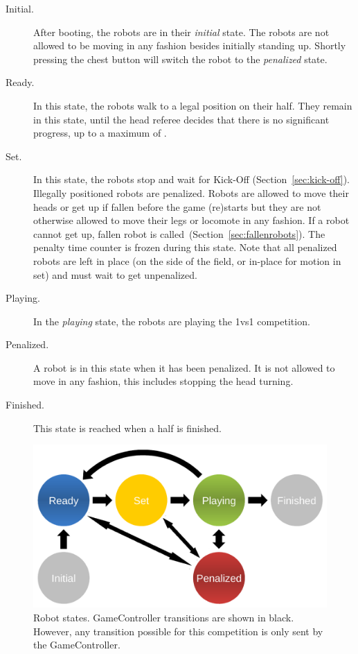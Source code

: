 \begin{description}
	\item[Initial.] After booting, the robots are in their \emph{initial} state. The robots are not allowed to be moving in any fashion besides initially standing up. Shortly pressing the chest button will switch the robot to the \emph{penalized} state.
	
	\item[Ready.] In this state, the robots walk to a legal position on their half. They remain in this state, until the head referee decides that there is no significant progress, up to a maximum of \KickOffAutoTime.
	
	\item[Set.] In this state, the robots stop and wait for Kick-Off  (\cf Section~\ref{sec:kick-off}).
	Illegally positioned robots are penalized.
	Robots are allowed to move their heads or get up if fallen before the game (re)starts but they are not otherwise allowed to move their legs or locomote in any fashion.
	If a robot cannot get up, fallen robot is called~(\cf Section~\ref{sec:fallenrobots}).
	The penalty time counter is frozen during this state.
	Note that all penalized robots are left in place (on the side of the field, or in-place for motion in set) and must wait to get unpenalized.
	
	\item[Playing.] In the \emph{playing} state, the robots are playing the 1vs1 competition.
	
	\item[Penalized.] A robot is in this state when it has been penalized. It is not allowed to move in any fashion,  this includes stopping the head turning.
	
	\item[Finished.] This state is reached when a half is finished.
\end{description}

\begin{figure}[t]
	\centerline{\includegraphics[width=0.9\columnwidth]{figs/states.pdf}}
	\caption{Robot states. GameController transitions are shown in black. However, any transition possible for this competition is only sent by the GameController.}
	\label{fig:robot_states}
\end{figure}

